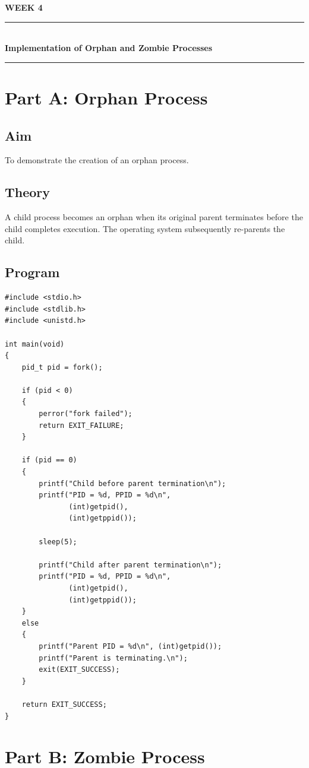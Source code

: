 \documentclass[12pt,a4paper]{report}
\newcommand{\experimenttitle}[2]{
\clearpage
\begin{center}
{\Large\bfseries\color{univblue} WEEK #1}\\[0.15cm]
\rule{\textwidth}{1pt}\\[0.2cm]
{\LARGE\bfseries #2}\\[0.2cm]
\rule{\textwidth}{1pt}
\end{center}
\vspace{0.4cm}
}
\begin{document}
\experimenttitle{4}{Implementation of Orphan and Zombie Processes}

\section*{Part A: Orphan Process}

\subsection*{Aim}

To demonstrate the creation of an orphan process.

\subsection*{Theory}

A child process becomes an orphan when its original parent terminates before
the child completes execution. The operating system subsequently re-parents
the child.

\subsection*{Program}

\begin{lstlisting}
#include <stdio.h>
#include <stdlib.h>
#include <unistd.h>

int main(void)
{
    pid_t pid = fork();

    if (pid < 0)
    {
        perror("fork failed");
        return EXIT_FAILURE;
    }

    if (pid == 0)
    {
        printf("Child before parent termination\n");
        printf("PID = %d, PPID = %d\n",
               (int)getpid(),
               (int)getppid());

        sleep(5);

        printf("Child after parent termination\n");
        printf("PID = %d, PPID = %d\n",
               (int)getpid(),
               (int)getppid());
    }
    else
    {
        printf("Parent PID = %d\n", (int)getpid());
        printf("Parent is terminating.\n");
        exit(EXIT_SUCCESS);
    }

    return EXIT_SUCCESS;
}
\end{lstlisting}

\section*{Part B: Zombie Process}
\end{document}
